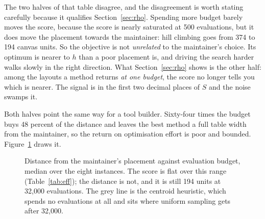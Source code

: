 \documentclass[11pt]{article}
\begin{document}
The two halves of that table disagree, and the disagreement is worth stating carefully because
it qualifies Section~\ref{sec:rho}. Spending more budget barely moves the score, because the
score is nearly saturated at 500 evaluations, but it does move the placement towards the
maintainer: hill climbing goes from 374 to 194 canvas units. So the objective is not
\emph{unrelated} to the maintainer's choice. Its optimum is nearer to $h$ than a poor placement
is, and driving the search harder walks slowly in the right direction. What Section~\ref{sec:rho}
shows is the other half: among the layouts a method returns \emph{at one budget}, the score no
longer tells you which is nearer. The signal is in the first two decimal places of $S$ and the
noise swamps it.

Both halves point the same way for a tool builder. Sixty-four times the budget buys 48 percent
of the distance and leaves the best method a full table width from the maintainer, so the return
on optimisation effort is poor and bounded. Figure~\ref{fig:eff} draws it.

\begin{figure}[h]
\centering
{}
\caption{Distance from the maintainer's placement against evaluation budget, median over the
eight instances. The score is flat over this range (Table~\ref{tab:eff}); the distance is not,
and it is still 194 units at 32{,}000 evaluations. The grey line is the centroid heuristic, which
spends no evaluations at all and sits where uniform sampling gets after 32{,}000.}
\label{fig:eff}
\end{figure}
\end{document}
